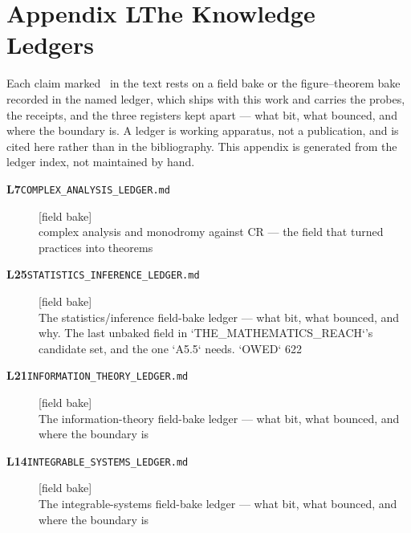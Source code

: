 \clearpage
\section*{Appendix L\quad The Knowledge Ledgers}\label{app:ledgers}
\small\noindent Each claim marked \ldgmarker\ in the text rests on a field bake or the figure--theorem bake recorded in the named ledger, which ships with this work and carries the probes, the receipts, and the three registers kept apart --- what bit, what bounced, and where the boundary is. A ledger is working apparatus, not a publication, and is cited here rather than in the bibliography. This appendix is generated from the ledger index, not maintained by hand.\par\medskip
\begingroup\renewcommand{\arraystretch}{1.25}
\begin{description}
\item[\textbf{L7}\quad\texttt{COMPLEX\_ANALYSIS\_LEDGER.md}]\hfill\textsf{[field bake]}\\
complex analysis and monodromy against CR --- the field that turned practices into theorems
\item[\textbf{L25}\quad\texttt{STATISTICS\_INFERENCE\_LEDGER.md}]\hfill\textsf{[field bake]}\\
The statistics/inference field-bake ledger --- what bit, what bounced, and why. The last unbaked field in `THE\_MATHEMATICS\_REACH`'s candidate set, and the one `A5.5` needs. `OWED` 622
\item[\textbf{L21}\quad\texttt{INFORMATION\_THEORY\_LEDGER.md}]\hfill\textsf{[field bake]}\\
The information-theory field-bake ledger --- what bit, what bounced, and where the boundary is
\item[\textbf{L14}\quad\texttt{INTEGRABLE\_SYSTEMS\_LEDGER.md}]\hfill\textsf{[field bake]}\\
The integrable-systems field-bake ledger --- what bit, what bounced, and where the boundary is
\end{description}
\endgroup
